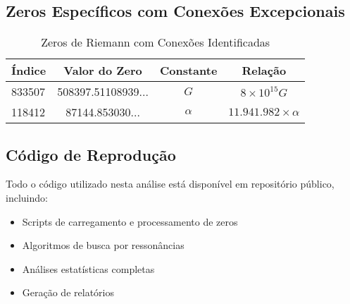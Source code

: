 \documentclass[11pt,a4paper]{article}
\begin{document}
\subsection{Zeros Específicos com Conexões Excepcionais}
\begin{table}[H]
\centering
\caption{Zeros de Riemann com Conexões Identificadas}
\begin{tabular}{lccc}
\toprule
\textbf{Índice} & \textbf{Valor do Zero} & \textbf{Constante} & \textbf{Relação} \\
\midrule
833507 & 508397.51108939... & $G$ & $8 \times 10^{15} G$ \\
118412 & 87144.853030... & $\alpha$ & $11.941.982 \times \alpha$ \\
\bottomrule
\end{tabular}
\end{table}

\subsection{Código de Reprodução}
Todo o código utilizado nesta análise está disponível em repositório público, incluindo:
\begin{itemize}
\item Scripts de carregamento e processamento de zeros
\item Algoritmos de busca por ressonâncias
\item Análises estatísticas completas
\item Geração de relatórios
\end{itemize}
\end{document}
